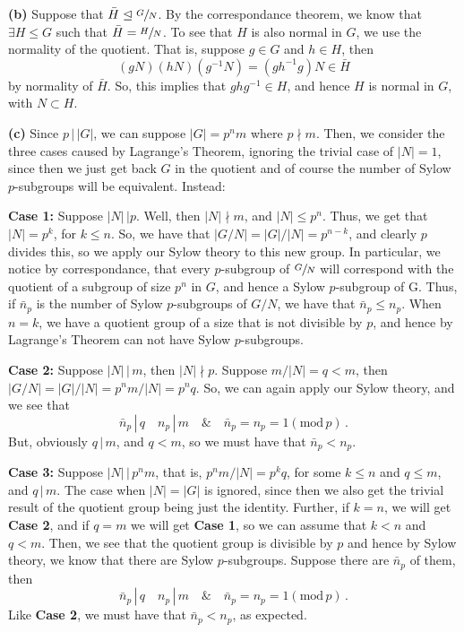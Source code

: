 \documentclass[10pt]{article}
\begin{document}
\textbf{(b)} Suppose that $\bar{H} \trianglelefteq \sfrac{G}{N}$. By the correspondance theorem, we know that $\exists H \leq G$ such that $\bar{H} = \sfrac{H}{N}$. To see that $H$ is also normal in $G$, we use the normality of the quotient. That is, suppose $g\in G$ and $h \in H$, then
\[ (gN)(hN)(g^{-1}N) = (gh^{-1}g)N \in \bar{H} \]
by normality of $\bar{H}$. So, this implies that $ghg^{-1} \in H$, and hence $H$ is normal in $G$, with $N\subset H$.

\textbf{(c)} Since $p \,| \,|G|$, we can suppose $|G| = p^{n}m$ where $p \nmid m$. Then, we consider the three cases caused by Lagrange's Theorem, ignoring the trivial case of $|N| = 1$, since then we just get back $G$ in the quotient and of course the number of Sylow $p$-subgroups will be equivalent. Instead:

\textbf{Case 1:} Suppose $|N| \, | p$. Well, then $|N| \nmid m$, and $|N| \leq p^{n}$. Thus, we get that $|N| = p^{k}$, for $k \leq n$. So, we have that $|G/N| = |G|/|N| = p^{n-k}$, and clearly $p$ divides this, so we apply our Sylow theory to this new group. In particular, we notice by correspondance, that every $p$-subgroup of $\sfrac{G}{N}$ will correspond with the quotient of a subgroup of size $p^{n}$ in $G$, and hence a Sylow $p$-subgroup of G. Thus, if $\bar{n}_{p}$ is the number of Sylow $p$-subgroups of $G/N$, we have that $\bar{n}_{p} \leq n_{p}$. When $n = k$, we have a quotient group of a size that is not divisible by $p$, and hence by Lagrange's Theorem can not have Sylow $p$-subgroups.

\textbf{Case 2:} Suppose $|N| \,| \,m$, then $|N| \nmid p$. Suppose $m/|N| = q < m$, then $|G/N| = |G|/|N| = p^{n}m/|N| = p^{n}q$. So, we can again apply our Sylow theory, and we see that
\[ \bar{n}_{p} \,| \,q \quad n_{p} \, | \,m \quad \& \quad \bar{n}_{p} = n_{p} = 1 (\text{mod}\, p) \, .\]
But, obviously $q \, | \, m$, and $q < m$, so we must have that $\bar{n}_{p} < n_{p}$.

\textbf{Case 3:} Suppose $|N| \, | \, p^{n}m$, that is, $p^{n}m/|N| = p^{k}q$, for some $k \leq n$ and $q \leq m$, and $q \, | \, m$. The case when $|N| = |G|$ is ignored, since then we also get the trivial result of the quotient group being just the identity. Further, if $k = n$, we will get \textbf{Case 2}, and if $q = m$ we will get \textbf{Case 1}, so we can assume that $k < n$ and $q < m$. Then, we see that the quotient group is divisible by $p$ and hence by Sylow theory, we know that there are Sylow $p$-subgroups. Suppose there are $\bar{n}_{p}$ of them, then
\[ \bar{n}_{p} \,| \,q \quad n_{p} \, | \,m \quad \& \quad \bar{n}_{p} = n_{p} = 1 (\text{mod}\, p) \, .\]
Like \textbf{Case 2}, we must have that $\bar{n}_{p} < n_{p}$, as expected.
\end{document}
